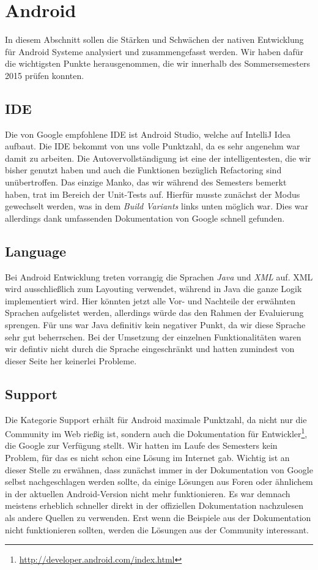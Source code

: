 \section{Android}
In diesem Abschnitt sollen die Stärken und Schwächen der nativen Entwicklung für Android Systeme analysiert und zusammengefasst werden. Wir haben dafür die wichtigsten Punkte herausgenommen, die wir innerhalb des Sommersemesters 2015 prüfen konnten.

\subsection{IDE}
Die von Google empfohlene IDE ist Android Studio, welche auf IntelliJ Idea aufbaut. Die IDE bekommt von uns volle Punktzahl, da es sehr angenehm war damit zu arbeiten. Die Autovervollständigung ist eine der intelligentesten, die wir bisher genutzt haben und auch die Funktionen bezüglich Refactoring sind unübertroffen. Das einzige Manko, das wir während des Semesters bemerkt haben, trat im Bereich der Unit-Tests auf. Hierfür musste zunächst der Modus gewechselt werden, was in dem \textit{Build Variants} links unten möglich war. Dies war allerdings dank umfassenden Dokumentation von Google schnell gefunden.

\subsection{Language}
Bei Android Entwicklung treten vorrangig die Sprachen \textit{Java} und \textit{XML} auf. XML wird ausschließlich zum Layouting verwendet, während in Java die ganze Logik implementiert wird. Hier könnten jetzt alle Vor- und Nachteile der erwähnten Sprachen aufgelistet werden, allerdings würde das den Rahmen der Evaluierung sprengen. Für uns war Java definitiv kein negativer Punkt, da wir diese Sprache sehr gut beherrschen. Bei der Umsetzung der einzelnen Funktionalitäten waren wir defintiv nicht durch die Sprache ein\-ge\-schränkt und hatten zumindest von dieser Seite her keinerlei Probleme.

\subsection{Support}
Die Kategorie Support erhält für Android maximale Punkt\-zahl, da nicht nur die Community im Web rießig ist, sondern auch die Dokumentation für Entwickler\footnote{\url{http://developer.android.com/index.html}}, die Google zur Verfügung stellt. Wir hatten im Laufe des Semesters kein Problem, für das es nicht schon eine Lösung im Internet gab. Wichtig ist an dieser Stelle zu erwähnen, dass zunächst immer in der Dokumentation von Google selbst nachgeschlagen werden sollte, da einige Lösungen aus Foren oder ähnlichem in der aktuellen Android-Version nicht mehr funktionieren. Es war demnach meistens erheblich schneller direkt in der offiziellen Dokumentation nachzulesen als andere Quellen zu verwenden. Erst wenn die Beispiele aus der Dokumentation nicht funktionieren sollten, werden die Lösungen aus der Community interessant.

